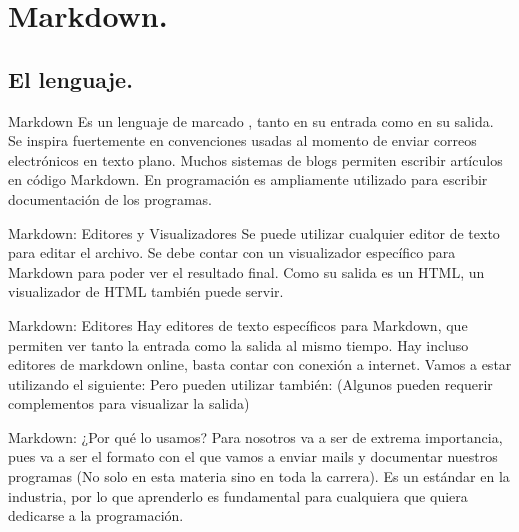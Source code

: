 \section{Markdown.}
\subsection{El lenguaje.}


\begin{frame}{Markdown}
  Es un lenguaje de marcado ,
  tanto en su entrada como en su salida.
  \jump
  Se inspira fuertemente en convenciones usadas al momento de enviar correos
  electrónicos en texto plano.
  \jump
  Muchos sistemas de blogs permiten escribir artículos en código Markdown.
  \jump
  En programación es ampliamente utilizado para escribir documentación de los
  programas.
  \jump
\end{frame}


\begin{frame}{Markdown: Editores y Visualizadores}
  Se puede utilizar cualquier editor de texto para editar el archivo.
  \jump
  Se debe contar con un visualizador específico para Markdown para poder ver el
  resultado final.
  \jump
  Como su salida es un HTML, un visualizador de HTML también puede servir.
\end{frame}


\begin{frame}{Markdown: Editores}
  Hay editores de texto específicos para Markdown, que permiten ver tanto la
  entrada como la salida al mismo tiempo.
  \jump
  Hay incluso editores de markdown online, basta contar con conexión a internet.
  Vamos a estar utilizando el siguiente:
  \jump
  \jump
  Pero pueden utilizar también:
  \jump
  \jump
  (Algunos pueden requerir complementos para visualizar la salida)
\end{frame}


\begin{frame}{Markdown: ¿Por qué lo usamos?}
  Para nosotros va a ser de extrema importancia, pues va a ser el
  formato con el que vamos a enviar mails y documentar nuestros
  programas (No solo en esta materia sino en toda la carrera).
  \jump
  Es un estándar en la industria, por lo que aprenderlo es fundamental
  para cualquiera que quiera dedicarse a la programación.
\end{frame}

